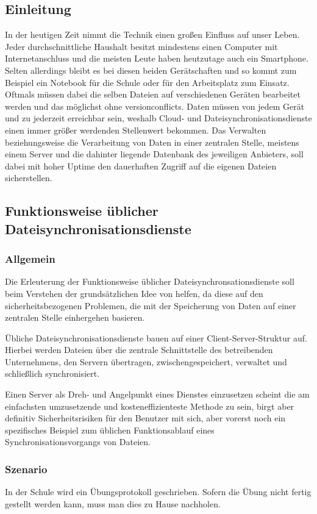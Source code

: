 \subsection{Einleitung}
In der heutigen Zeit nimmt die Technik einen großen Einfluss auf unser Leben.
Jeder durchschnittliche Haushalt besitzt mindestens einen Computer mit
Internetanschluss und die meisten Leute haben heutzutage auch ein Smartphone.
Selten allerdings bleibt es bei diesen beiden Gerätschaften und so kommt zum Beispiel
ein Notebook für die Schule oder für den Arbeitsplatz zum Einsatz. Oftmals
müssen dabei die selben Dateien auf verschiedenen Geräten bearbeitet werden und
das möglichst ohne \glspl{versionconflict}. Daten müssen von jedem
Gerät und zu jederzeit erreichbar sein, weshalb Cloud- und
Dateisynchronisationsdienste einen immer größer werdenden Stellenwert bekommen.
Das Verwalten beziehungsweise die Verarbeitung von Daten in einer
zentralen Stelle, meistens einem Server und die dahinter liegende Datenbank des
jeweiligen Anbieters, soll dabei mit hoher Uptime den dauerhaften Zugriff auf
die eigenen Dateien sicherstellen.

\subsection{Funktionsweise üblicher Dateisynchronisationsdienste}
\subsubsection{Allgemein}
Die Erleuterung der Funktionsweise üblicher Dateisynchronsationsdienste soll beim
Verstehen der grundsätzlichen Idee von \sblit helfen, da diese auf den
sicherheitsbezogenen Problemen, die mit der Speicherung von Daten auf einer
zentralen Stelle einhergehen basieren.

Übliche Dateisynchronisationsdienste bauen auf einer Client-Server-Struktur auf.
Hierbei werden Dateien über die zentrale Schnittstelle des betreibenden
Unternehmens, den Servern übertragen, zwischengespeichert, verwaltet und schließlich
synchronisiert.

Einen Server als Dreh- und Angelpunkt eines Dienstes einzusetzen scheint die am
einfachsten umzusetzende und kosteneffizienteste Methode zu sein, birgt aber
definitiv Sicherheitsrisiken für den Benutzer mit sich, aber vorerst noch ein
spezifisches Beispiel zum üblichen Funktionsablauf eines Synchronisationsvorgangs von
Dateien.

\subsubsection{Szenario}
In der Schule wird ein Übungsprotokoll geschrieben. Sofern die Übung nicht
fertig gestellt werden kann, muss man dies zu Hause nachholen.


